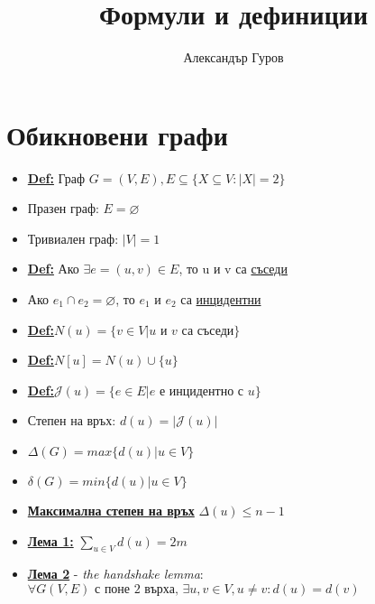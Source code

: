 \documentclass{article}
\title{Формули и дефиниции}
\author{Александър Гуров}
\date{\datebulgarian{\today}}
\begin{document}
\maketitle
\section{Обикновени графи}

\begin{itemize}
    \item[] \underline{\textbf{Def:}} Граф $G=(V,E), E\subseteq\{X\subseteq V: |X|=2\} $

    \item[] Празен граф: $E=\varnothing $

    \item[] Тривиален граф: $|V|=1$

    \item[] \underline{\textbf{Def:}} Ако $\exists e=(u,v)\in E$, то u и v са \underline{съседи}

    \item[] Ако $e_1\cap e_2 = \varnothing$, то $e_1$ и $e_2$ са \underline{инцидентни}

    \item[] \underline{\textbf{Def:}}$N(u)=\{ v\in V | u \text{ и } v \text{ са съседи}\}$

    \item[] \underline{\textbf{Def:}}$N[u]=N(u)\cup \{u\}$

    \item[] \underline{\textbf{Def:}}$\mathcal{J}(u)=\{ e\in E | e \text{ е инцидентно с } u \}$

    \item[] Степен на връх: $d(u)= |\mathcal{J}(u)|$

    \item[] $\Delta (G)= max\{d(u) |  u\in V\}$

    \item[] $\delta(G)= min\{d(u) |  u\in V\}$

    \item[] \underline{\textbf{Максимална степен на връх}} $\Delta(u)\leq n-1$

    \item[] \underline{\textbf{Лема 1:}} $\sum_{u\in V}d(u)=2m$

    \item[] \underline{\textbf{Лема 2}} - \emph{the handshake lemma}: \\ $\forall G(V,E) \text{ с поне 2 върха, } \exists u,v\in V, u \neq v: d(u)=d(v)$


\end{itemize}
\end{document}

